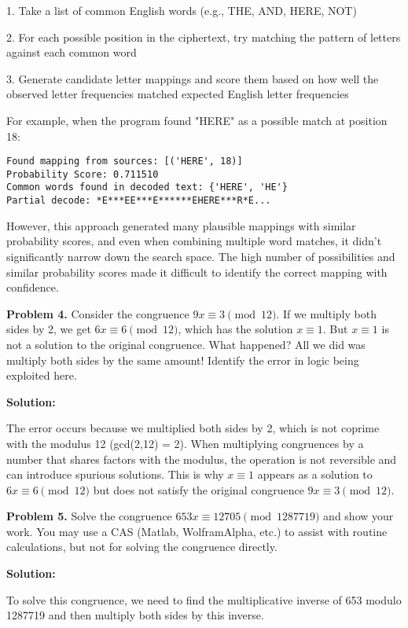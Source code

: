 \documentclass[12pt]{article}
\begin{document}
1. Take a list of common English words (e.g., THE, AND, HERE, NOT)

2. For each possible position in the ciphertext, try matching the pattern of letters against each common word

3. Generate candidate letter mappings and score them based on how well the observed letter frequencies matched expected English letter frequencies

For example, when the program found "HERE" as a possible match at position 18:
\begin{verbatim}
Found mapping from sources: [('HERE', 18)]
Probability Score: 0.711510
Common words found in decoded text: {'HERE', 'HE'}
Partial decode: *E***EE***E******EHERE***R*E...
\end{verbatim}

However, this approach generated many plausible mappings with similar probability scores, and even when combining multiple word matches, it didn't significantly narrow down the search space. The high number of possibilities and similar probability scores made it difficult to identify the correct mapping with confidence.

\newpage
\noindent\textbf{Problem 4.} Consider the congruence $9x \equiv 3 \pmod{12}$. If we multiply both sides by 2, we get $6x \equiv 6 \pmod{12}$, which has the solution $x \equiv 1$. But $x \equiv 1$ is not a solution to the original congruence. What happened? All we did was multiply both sides by the same amount! Identify the error in logic being exploited here.

\vspace{1em}
\textbf{Solution:}

The error occurs because we multiplied both sides by 2, which is not coprime with the modulus 12 (gcd(2,12) = 2). When multiplying congruences by a number that shares factors with the modulus, the operation is not reversible and can introduce spurious solutions. This is why $x \equiv 1$ appears as a solution to $6x \equiv 6 \pmod{12}$ but does not satisfy the original congruence $9x \equiv 3 \pmod{12}$.

\newpage
\noindent\textbf{Problem 5.} Solve the congruence $653x \equiv 12705 \pmod{1287719}$ and show your work. You may use a CAS (Matlab, WolframAlpha, etc.) to assist with routine calculations, but not for solving the congruence directly.

\vspace{1em}
\textbf{Solution:}

To solve this congruence, we need to find the multiplicative inverse of 653 modulo 1287719 and then multiply both sides by this inverse.
\end{document}
